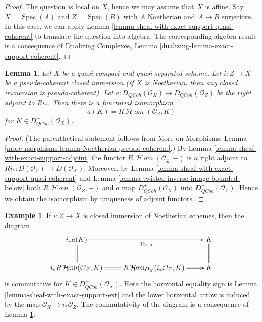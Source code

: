\documentclass{stacks-project}
\theoremstyle{plain}
\newtheorem{lemma}[subsection]{Lemma}
\theoremstyle{definition}
\newtheorem{example}[subsection]{Example}
\theoremstyle{remark}
\numberwithin{equation}{subsection}
\def\Spec{\mathop{\mathrm{Spec}}}
\def\SheafHom{\mathop{\mathcal{H}\!\mathit{om}}\nolimits}
\def\QCoh{\mathit{QCoh}}
\begin{document}
\begin{proof}
The question is local on $X$, hence we may assume that $X$ is affine.
Say $X = \Spec(A)$ and $Z = \Spec(B)$ with $A$ Noetherian and
$A \to B$ surjective. In this case, we can apply
Lemma \ref{lemma-sheaf-with-exact-support-quasi-coherent}
to translate the question into algebra.
The corresponding algebra result is a consequence of
Dualizing Complexes, Lemma \ref{dualizing-lemma-exact-support-coherent}.
\end{proof}

\begin{lemma}
\label{lemma-twisted-inverse-image-closed}
Let $X$ be a quasi-compact and quasi-separated scheme.
Let $i : Z \to X$ be a pseudo-coherent closed immersion
(if $X$ is Noetherian, then any closed immersion is pseudo-coherent).
Let $a : D_\QCoh(\mathcal{O}_X) \to D_\QCoh(\mathcal{O}_Z)$ be the
right adjoint to $Ri_*$. Then there is a functorial isomorphism
$$
a(K) = R\SheafHom(\mathcal{O}_Z, K)
$$
for $K \in D_\QCoh^+(\mathcal{O}_X)$.
\end{lemma}

\begin{proof}
(The parenthetical statement follows from More on Morphisms, Lemma
\ref{more-morphisms-lemma-Noetherian-pseudo-coherent}.)
By Lemma \ref{lemma-sheaf-with-exact-support-adjoint}
the functor $R\SheafHom(\mathcal{O}_Z, -)$ is a right adjoint
to $Ri_* : D(\mathcal{O}_Z) \to D(\mathcal{O}_X)$. Moreover,
by Lemma \ref{lemma-sheaf-with-exact-support-quasi-coherent}
and Lemma \ref{lemma-twisted-inverse-image-bounded-below}
both $R\SheafHom(\mathcal{O}_Z, -)$ and $a$ map
$D_\QCoh^+(\mathcal{O}_X)$ into $D_\QCoh^+(\mathcal{O}_Z)$.
Hence we obtain the isomorphism by uniqueness of adjoint
functors.
\end{proof}

\begin{example}
\label{example-trace-closed-immersion}
If $i : Z \to X$ is closed immersion of Noetherian schemes, then
the diagram
$$
\xymatrix{
i_*a(K) \ar[rr]_-{\text{Tr}_{i, K}} \ar@{=}[d] & &
K \ar@{=}[d] \\
i_*R\SheafHom(\mathcal{O}_Z, K) \ar@{=}[r] &
R\SheafHom_{\mathcal{O}_X}(i_*\mathcal{O}_Z, K)
\ar[r] & K
}
$$
is commutative for $K \in D_\QCoh^+(\mathcal{O}_X)$.
Here the horizontal equality sign is
Lemma \ref{lemma-sheaf-with-exact-support-ext} and the
lower horizontal arrow is induced
by the map $\mathcal{O}_X \to i_*\mathcal{O}_Z$. The commutativity
of the diagram is a consequence of
Lemma \ref{lemma-twisted-inverse-image-closed}.
\end{example}
\end{document}
